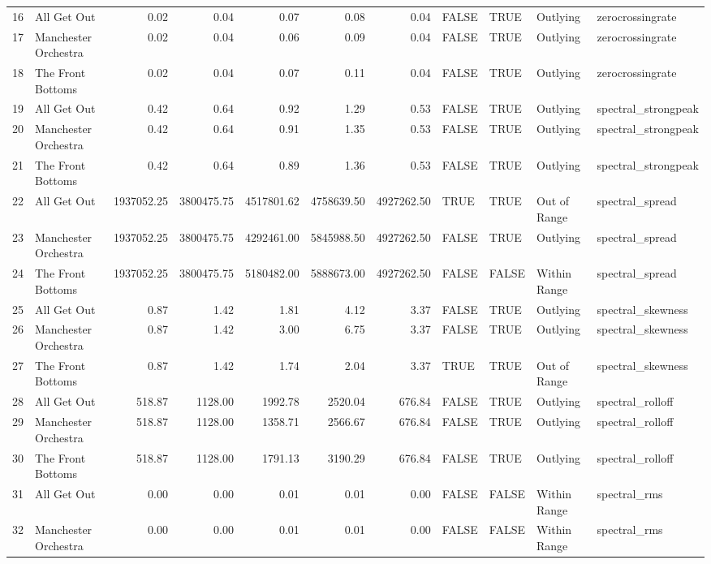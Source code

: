\begin{table}[ht]
\begin{tabular}{rlrrrrrllll}
  16 & All Get Out & 0.02 & 0.04 & 0.07 & 0.08 & 0.04 & FALSE & TRUE & Outlying & zerocrossingrate \\ 
  17 & Manchester Orchestra & 0.02 & 0.04 & 0.06 & 0.09 & 0.04 & FALSE & TRUE & Outlying & zerocrossingrate \\ 
  18 & The Front Bottoms & 0.02 & 0.04 & 0.07 & 0.11 & 0.04 & FALSE & TRUE & Outlying & zerocrossingrate \\ 
  19 & All Get Out & 0.42 & 0.64 & 0.92 & 1.29 & 0.53 & FALSE & TRUE & Outlying & spectral\_strongpeak \\ 
  20 & Manchester Orchestra & 0.42 & 0.64 & 0.91 & 1.35 & 0.53 & FALSE & TRUE & Outlying & spectral\_strongpeak \\ 
  21 & The Front Bottoms & 0.42 & 0.64 & 0.89 & 1.36 & 0.53 & FALSE & TRUE & Outlying & spectral\_strongpeak \\ 
  22 & All Get Out & 1937052.25 & 3800475.75 & 4517801.62 & 4758639.50 & 4927262.50 & TRUE & TRUE & Out of Range & spectral\_spread \\ 
  23 & Manchester Orchestra & 1937052.25 & 3800475.75 & 4292461.00 & 5845988.50 & 4927262.50 & FALSE & TRUE & Outlying & spectral\_spread \\ 
  24 & The Front Bottoms & 1937052.25 & 3800475.75 & 5180482.00 & 5888673.00 & 4927262.50 & FALSE & FALSE & Within Range & spectral\_spread \\ 
  25 & All Get Out & 0.87 & 1.42 & 1.81 & 4.12 & 3.37 & FALSE & TRUE & Outlying & spectral\_skewness \\ 
  26 & Manchester Orchestra & 0.87 & 1.42 & 3.00 & 6.75 & 3.37 & FALSE & TRUE & Outlying & spectral\_skewness \\ 
  27 & The Front Bottoms & 0.87 & 1.42 & 1.74 & 2.04 & 3.37 & TRUE & TRUE & Out of Range & spectral\_skewness \\ 
  28 & All Get Out & 518.87 & 1128.00 & 1992.78 & 2520.04 & 676.84 & FALSE & TRUE & Outlying & spectral\_rolloff \\ 
  29 & Manchester Orchestra & 518.87 & 1128.00 & 1358.71 & 2566.67 & 676.84 & FALSE & TRUE & Outlying & spectral\_rolloff \\ 
  30 & The Front Bottoms & 518.87 & 1128.00 & 1791.13 & 3190.29 & 676.84 & FALSE & TRUE & Outlying & spectral\_rolloff \\ 
  31 & All Get Out & 0.00 & 0.00 & 0.01 & 0.01 & 0.00 & FALSE & FALSE & Within Range & spectral\_rms \\ 
  32 & Manchester Orchestra & 0.00 & 0.00 & 0.01 & 0.01 & 0.00 & FALSE & FALSE & Within Range & spectral\_rms \\ 

\end{tabular}
\end{table}
